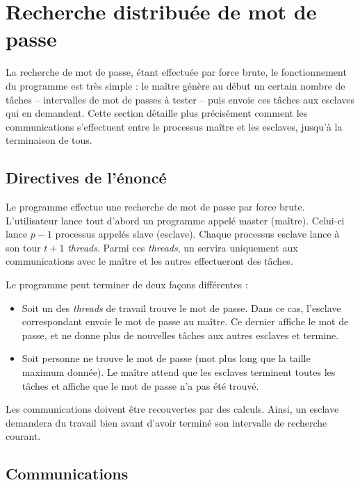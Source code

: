 \section{Recherche distribuée de mot de passe} %
\label{sec:recherche_de_mot_de_passe}

La recherche de mot de passe, étant effectuée par force brute, le fonctionnement du programme est très simple : le maître génère au début un certain nombre de tâches -- intervalles de mot de passes à tester -- puis envoie ces tâches aux esclaves qui en demandent. Cette section détaille plus précisément comment les communications s'effectuent entre le processus maître et les esclaves, jusqu'à la terminaison de tous.

\subsection{Directives de l'énoncé} %
\label{sub:enonce}

Le programme effectue une recherche de mot de passe par force brute. L'utilisateur lance tout d'abord un programme appelé master (maître). Celui-ci lance $p-1$ processus appelés slave (esclave). Chaque processus esclave lance à son tour $t+1$ \emph{threads}. Parmi ces \emph{threads}, un servira uniquement aux communications avec le maître et les autres effectueront des tâches. 

Le programme peut terminer de deux façons différentes :
\begin{itemize}
	\item Soit un des \emph{threads} de travail trouve le mot de passe. Dans ce cas, l'esclave correspondant envoie le mot de passe au maître. Ce dernier affiche le mot de passe, et ne donne plus de nouvelles tâches aux autres esclaves et termine.
	\item Soit personne ne trouve le mot de passe (mot plus long que la taille maximum donnée). Le maître attend que les esclaves terminent toutes les tâches et affiche que le mot de passe n'a pas été trouvé.
\end{itemize}

Les communications doivent être recouvertes par des calculs. Ainsi, un esclave demandera du travail bien avant d'avoir terminé son intervalle de recherche courant.

\subsection{Communications} %
\label{sub:communication}

